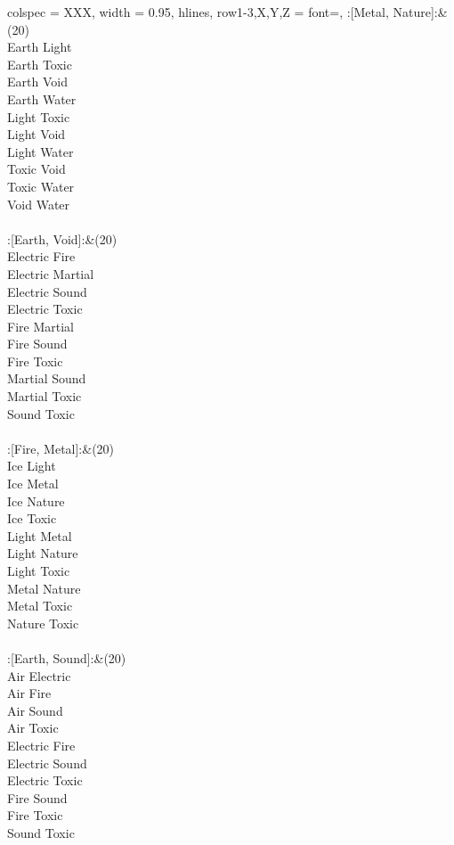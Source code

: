 \begin{longtblr}[
	caption = {2v2 Defending Resisted},
	label = {2v2-Defending-Resisted},
]{
	colspec = {XXX}, width = 0.95\linewidth,
	hlines,
	row{1-3,X,Y,Z} = {font=\bfseries},
}
	:[Metal, Nature]:&{(20)\\
	Earth Light \\
	Earth Toxic \\
	Earth Void \\
	Earth Water \\
	Light Toxic \\
	Light Void \\
	Light Water \\
	Toxic Void \\
	Toxic Water \\
	Void Water \\
	}\\

	:[Earth, Void]:&{(20)\\
	Electric Fire \\
	Electric Martial \\
	Electric Sound \\
	Electric Toxic \\
	Fire Martial \\
	Fire Sound \\
	Fire Toxic \\
	Martial Sound \\
	Martial Toxic \\
	Sound Toxic \\
	}\\

	:[Fire, Metal]:&{(20)\\
	Ice Light \\
	Ice Metal \\
	Ice Nature \\
	Ice Toxic \\
	Light Metal \\
	Light Nature \\
	Light Toxic \\
	Metal Nature \\
	Metal Toxic \\
	Nature Toxic \\
	}\\

	:[Earth, Sound]:&{(20)\\
	Air Electric \\
	Air Fire \\
	Air Sound \\
	Air Toxic \\
	Electric Fire \\
	Electric Sound \\
	Electric Toxic \\
	Fire Sound \\
	Fire Toxic \\
	Sound Toxic \\
	}\\


\end{longtblr}
